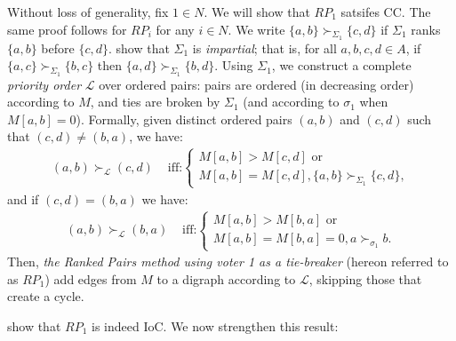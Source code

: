Without loss of generality, fix $1\in N$. We will show that $RP_1$ satsifes CC. The same proof follows for $RP_i$ for any $i \in N$. We write $\{a,b\} \succ_{\Sigma_1} \{c,d\}$ if $\Sigma_1$ ranks $\{a,b\}$ before $\{c,d\}$. \citeauthor{Zavist89:Complete} show that $\Sigma_1$ is \textit{impartial}; that is, for all $a,b,c,d\in A$, if $\{a,c\}\succ_{\Sigma_1}\{b,c\}$ then  $\{a,d\}\succ_{\Sigma_1}\{b,d\}$. 
Using $\Sigma_1$, we construct a complete \emph{priority order} $\mathcal{L}$ over ordered pairs: pairs are ordered (in decreasing order) according to $M$, and ties are broken by $\Sigma_1$ (and according to $\sigma_1$ when $M[a,b]=0$). Formally, given distinct ordered pairs $(a,b)$ and $(c,d)$ such that $(c,d) \neq (b,a)$, we have:
\begin{align*}
    (a,b) \succ_{\mathcal{L}} (c,d) & \text{ iff:} \begin{cases} M[a,b]> M[c,d] \text{ or }\\  M[a,b]= M[c,d], \{a,b\} \succ_{\Sigma_1} \{c,d\},\end{cases}
\end{align*}
and if $(c,d)=(b,a)$ we have:
\begin{align*}
    (a,b) \succ_{\mathcal{L}} (b,a) & \text{ iff:}\begin{cases} M[a,b]> M[b,a] \text{ or }\\ M[a,b]= M[b,a]=0, a  \succ_{\sigma_1} b. \end{cases}
\end{align*}
Then, \textit{the Ranked Pairs method using voter 1 as a tie-breaker} (hereon referred to as $RP_1$) add edges from $M$ to a digraph according to $\mathcal{L}$, skipping those that create a cycle. 

\citet{Zavist89:Complete} show that $RP_1$ is indeed IoC. We now strengthen this result:

